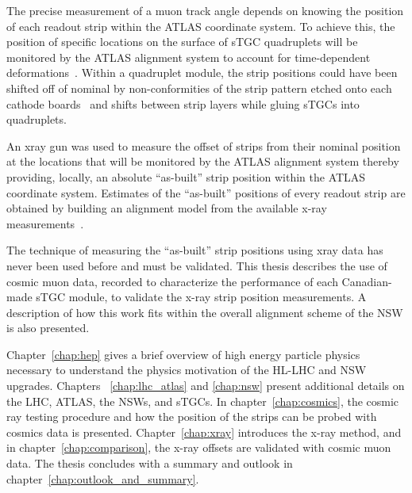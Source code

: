 The precise measurement of  a muon track angle depends on knowing the position of each readout strip within the  ATLAS coordinate system.  To achieve this, the position of specific locations on the surface of sTGC quadruplets will be monitored by the ATLAS alignment system to account for time-dependent deformations~\cite{nsw_tdr}. Within a quadruplet module, the strip positions could have been shifted off of nominal by non-conformities of the strip pattern etched onto each cathode boards~\cite{carlson_results_2019} and shifts between strip layers while gluing sTGCs into quadruplets.

An xray gun was used to measure the offset of strips from their nominal position at the locations that will be monitored by the ATLAS alignment system thereby providing, locally, an absolute “as-built” strip position within the ATLAS coordinate system.  Estimates of the “as-built” positions of every readout strip are obtained by building an alignment model from the available x-ray measurements~\cite{lefebvre_precision_2020}.

The technique of measuring the “as-built” strip positions using xray data has never been used before and must be validated. This thesis describes the use of cosmic muon data, recorded to characterize the performance of each Canadian-made sTGC module, to validate the x-ray strip position measurements.  A description of how this work fits within the overall alignment scheme of the NSW is also presented. 

Chapter~\ref{chap:hep} gives a brief overview of high energy particle physics necessary to understand the physics motivation of the HL-LHC and NSW upgrades. Chapters ~\ref{chap:lhc_atlas} and \ref{chap:nsw} present additional details on the LHC, ATLAS, the NSWs, and sTGCs. In chapter~\ref{chap:cosmics}, the cosmic ray testing procedure and how the position of the strips can be probed with cosmics data is presented. Chapter~\ref{chap:xray} introduces the x-ray method, and in chapter~\ref{chap:comparison}, the x-ray offsets are validated with cosmic muon data. The thesis concludes with a summary and outlook in chapter~\ref{chap:outlook_and_summary}.

